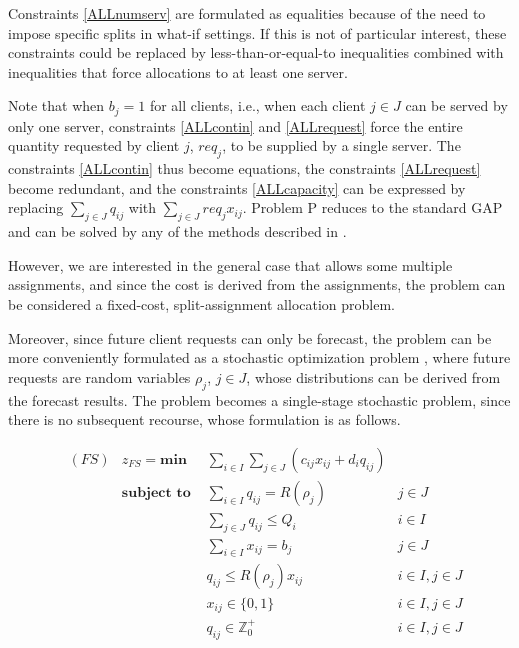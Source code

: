 \documentclass[ijoc,sglanonrev]{informs4}
\begin{document}
Constraints \ref{ALLnumserv} are formulated as equalities because of the need to impose specific splits in what-if settings. If this is not of particular interest, these constraints could be replaced by less-than-or-equal-to inequalities combined with inequalities that force allocations to at least one server.

Note that when $b_j = 1$ for all clients, i.e., when each client $j \in J$ can be served by only one server, constraints \ref{ALLcontin} and \ref{ALLrequest} force the entire quantity requested by client $j$, $req_j$, to be supplied by a single server. The constraints \ref{ALLcontin} thus become equations, the constraints \ref{ALLrequest} become redundant, and the constraints \ref{ALLcapacity} can be expressed by replacing $\sum_{j \in J}q_{ij}$ with $\sum_{j \in J}req_j x_{ij}$. Problem P reduces to the standard GAP and can be solved by any of the methods described in \citep{matheuristics}.

However, we are interested in the general case that allows some multiple assignments, and since the cost is derived from the assignments, the problem can be considered a fixed-cost, split-assignment allocation problem.

Moreover, since future client requests can only be forecast, the problem can be more conveniently formulated as a stochastic optimization problem \citep{KM10,BL11}, where future requests are random variables $\rho_j$, $j \in J$, whose distributions can be derived from the forecast results. The problem becomes a single-stage stochastic problem, since there is no subsequent recourse, whose formulation is as follows.

\begin{align}
&(FS) & z_{FS} = \textbf{min } & \sum_{i \in I} \sum_{j \in J} ( c_{ij}x_{ij} + d_i q_{ij} ) \label{SALLobj}\\
& &  \textbf{subject to }
     & \sum_{i \in I} q_{ij} = R(\rho_j) & j \in J  \label{SALLrequest}\\
& &  & \sum_{j \in J}q_{ij} \leq Q_i & i \in I \label{SALLcapacity}\\
& &  & \sum_{i \in I} x_{ij} = b_j & j \in J  \label{SALLnumserv}\\
& &  & q_{ij} \leq R(\rho_j) x_{ij} & i \in I, j \in J \label{SALLcontin}\\
& &  & x_{ij} \in \{0,1\} & i\in I, j \in J \label{SALLx}\\
& &  & q_{ij} \in \mathbb{Z}^+_0 & i\in I, j \in J \label{SALLq}
\end{align}
\end{document}
